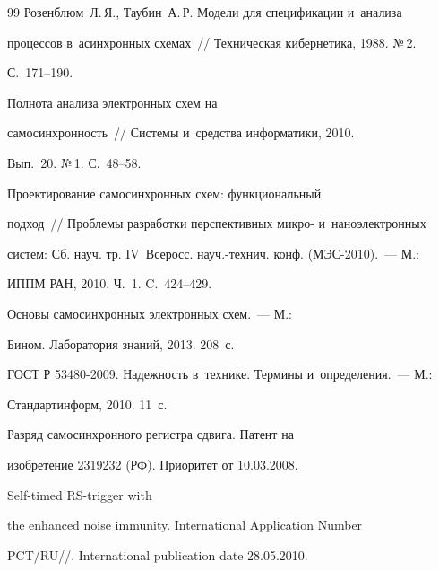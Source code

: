 {{\begin{thebibliography}{99}
{Розенблюм~Л.\,Я., Таубин~А.\,Р.} Модели для спецификации и~анализа 


процессов в~асинхронных схемах~/\!\!/ Техническая кибернетика, 1988. №\,2. 


С.~171--190.




 Полнота анализа электронных схем на 


самосинхронность~/\!\!/ Сис\-те\-мы и~средства информатики, 2010. 


Вып.~20. №\,1. С.~48--58.




 Проектирование самосинхронных схем: функциональный 


подход~/\!\!/ Проблемы разработки перспективных микро- и~наноэлектронных 


систем:   Сб. науч. тр. IV~Всеросс. науч.-технич. конф. (МЭС-2010).~--- М.: 


ИППМ РАН, 2010. Ч.~1. C.~424--429.




 Основы самосинхронных электронных схем.~--- М.: 


Бином. Лаборатория знаний, 2013. 208~с.




ГОСТ Р 53480-2009. Надежность в~технике. Термины и~определения.~--- М.: 


Стандартинформ, 2010. 11~с.




 Разряд самосинхронного регистра сдвига. Патент на 


изобретение 2319232 (РФ). Приоритет от 10.03.2008.




 Self-timed RS-trigger with 


the enhanced noise immunity. International Application Number 


PCT\!/\!RU\!/\!/. International publication date 28.05.2010.


     \end{thebibliography}


} }








